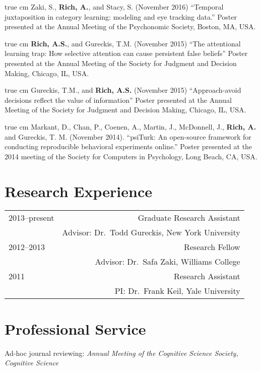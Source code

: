 \documentclass[12pt]{my_cv}
\def\ind{\hangindent=1 true cm\hangafter=1 \noindent}
\begin{document}
\ind Zaki, S., \textbf{Rich, A.}, and Stacy, S. (November 2016)
``Temporal juxtaposition in category learning: modeling and eye tracking data.''
Poster presented at the Annual Meeting of the Psychonomic Society, Boston, MA, USA.

\ind \textbf{Rich, A.S.}, and Gureckis, T.M. (November 2015) ``The attentional
learning trap: How selective attention can cause persistent false beliefs''
Poster presented at the Annual Meeting of the Society for Judgment and Decision
Making, Chicago, IL, USA.

\ind Gureckis, T.M., and \textbf{Rich, A.S.} (November 2015) ``Approach-avoid
decisions reflect the value of information'' Poster presented at the Annual
Meeting of the Society for Judgment and Decision Making, Chicago, IL, USA.

\ind Markant, D., Chan, P., Coenen, A., Martin, J., McDonnell, J., \textbf{Rich,
  A.} and Gureckis, T. M. (November 2014). ``psiTurk: An open-source framework
for conducting reproducible behavioral experiments online.'' Poster presented at
the 2014 meeting of the Society for Computers in Psychology, Long Beach, CA,
USA.

\section{Research Experience}
\begin{tabular}{L R}
2013--present& Graduate Research Assistant\\
&Advisor: Dr.\ Todd Gureckis, New York University\\[1ex]
2012--2013& Research Fellow\\
&Advisor: Dr.\ Safa Zaki, Williams College\\[1ex]
2011&Research Assistant\\
&PI: Dr.\ Frank Keil, Yale University\\
\end{tabular}

\section{Professional Service}

Ad-hoc journal reviewing: \emph{Annual Meeting of the Cognitive Science Society,
Cognitive Science}
\end{document}
